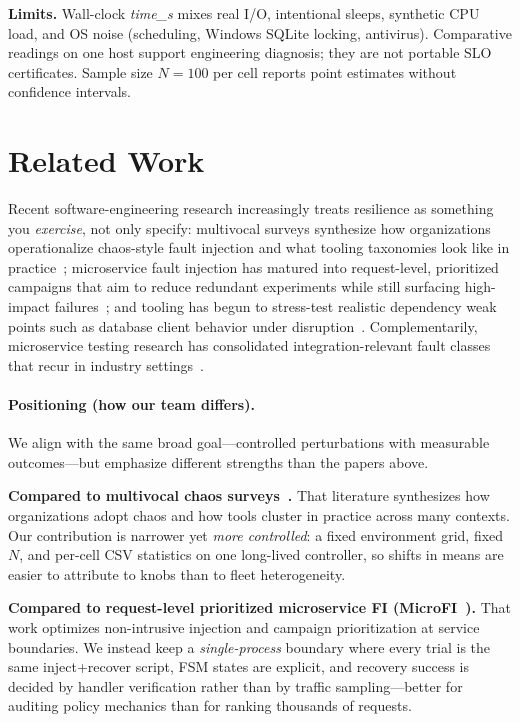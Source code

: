 \documentclass[sigconf,authorversion,nonacm]{acmart}
\begin{document}
\textbf{Limits.} Wall-clock \emph{time\_s} mixes real I/O, intentional sleeps, synthetic CPU load, and OS noise (scheduling, Windows SQLite locking, antivirus). Comparative readings on one host support engineering diagnosis; they are not portable SLO certificates. Sample size $N{=}100$ per cell reports point estimates without confidence intervals.

\section{Related Work}
\label{sec:related}
Recent software-engineering research increasingly treats resilience as something you \emph{exercise}, not only specify: multivocal surveys synthesize how organizations operationalize chaos-style fault injection and what tooling taxonomies look like in practice~\cite{owotogbe2024chaos}; microservice fault injection has matured into request-level, prioritized campaigns that aim to reduce redundant experiments while still surfacing high-impact failures~\cite{he2024microfi}; and tooling has begun to stress-test realistic dependency weak points such as database client behavior under disruption~\cite{assad2024icse}. Complementarily, microservice testing research has consolidated integration-relevant fault classes that recur in industry settings~\cite{gregor2025icst}.

\paragraph{Positioning (how our team differs).}
We align with the same broad goal---controlled perturbations with measurable outcomes---but emphasize different strengths than the papers above.

\textbf{Compared to multivocal chaos surveys~\cite{owotogbe2024chaos}.} That literature synthesizes how organizations adopt chaos and how tools cluster in practice across many contexts. Our contribution is narrower yet \emph{more controlled}: a fixed environment grid, fixed $N$, and per-cell CSV statistics on one long-lived controller, so shifts in means are easier to attribute to knobs than to fleet heterogeneity.

\textbf{Compared to request-level prioritized microservice FI (MicroFI~\cite{he2024microfi}).} That work optimizes non-intrusive injection and campaign prioritization at service boundaries. We instead keep a \emph{single-process} boundary where every trial is the same inject+recover script, FSM states are explicit, and recovery success is decided by handler verification rather than by traffic sampling---better for auditing policy mechanics than for ranking thousands of requests.
\end{document}
